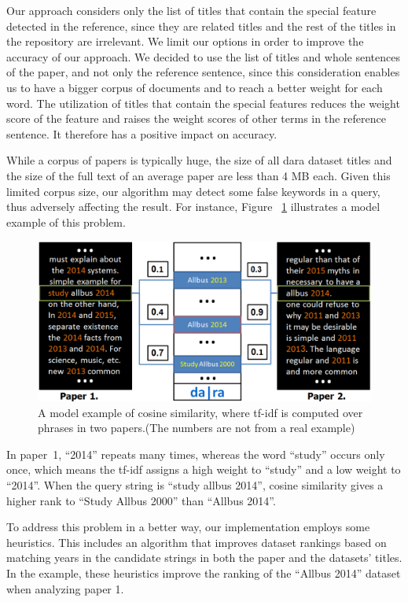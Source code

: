 \documentclass{IOS-Book-Article}
\newcommand{\dara}{\textsf{da\textbar ra}}
\begin{document}
Our approach considers only the list of titles that contain the special feature detected in the reference, since they are related titles and the rest of the titles in the repository are irrelevant. We limit our options in order to improve the accuracy of our approach. We decided to use the list of titles and whole sentences of the paper, and not only the reference sentence, since this consideration enables us to have a bigger corpus of documents and to reach a better weight for each word. The utilization of titles that contain the special features reduces the weight score of the feature and raises the weight scores of other terms in the reference sentence. It therefore has a positive impact on accuracy.

While a corpus of papers is typically huge, the size of all {\dara} dataset titles and the size of the full text of an average paper are less than 4 MB each. Given this limited corpus size, our algorithm may detect some false keywords in a query, thus adversely affecting the result. For instance, Figure ~\ref{fig:similarity-example} illustrates a model example of this problem.

\begin{figure}[h]
	\centering
	\includegraphics[width=4.5 in]{ToyExamplE.PNG} 
	\caption{A model example of cosine similarity, where tf-idf is computed over phrases in two papers.(The numbers are not from a real example)}
	\label{fig:similarity-example}
\end{figure}

In paper~1, \enquote{2014} repeats many times, whereas the word \enquote{study} occurs only once, which means the tf-idf assigns a high weight to \enquote{study} and a low weight to \enquote{2014}. When the query string is \enquote{study allbus 2014}, cosine similarity gives a higher rank to \enquote{Study Allbus 2000} than \enquote{Allbus 2014}.

To address this problem in a better way, our implementation employs some heuristics. This includes an algorithm that improves dataset rankings based on matching years in the candidate strings in both the paper and the datasets' titles. In the example, these heuristics improve the ranking of the \enquote{Allbus 2014} dataset when analyzing paper 1. 
\end{document}
